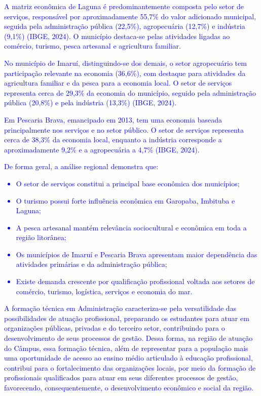 \documentclass{../../modelos/latex-shared/ifsc-ppc}
\newcommand{\revisao}[1]{\textcolor{blue}{#1}}
\newcommand{\revisao}[1]{#1}
\begin{document}
\revisao{A matriz econômica de Laguna é predominantemente composta pelo setor de serviços, responsável por aproximadamente 55,7\% do valor adicionado municipal, seguida pela administração pública (22,5\%), agropecuária (12,7\%) e indústria (9,1\%) (IBGE, 2024). O município destaca-se pelas atividades ligadas ao comércio, turismo, pesca artesanal e agricultura familiar.}

\revisao{No município de Imaruí, distinguindo-se dos demais, o setor agropecuário tem participação relevante na economia (36,6\%), com destaque para atividades da agricultura familiar e da pesca para a economia local. O setor de serviços representa cerca de 29,3\% da economia do município, seguido pela administração pública (20,8\%) e pela indústria (13,3\%) (IBGE, 2024).}

\revisao{Em Pescaria Brava, emancipado em 2013, tem uma economia baseada principalmente nos serviços e no setor público. O setor de serviços representa cerca de 38,3\% da economia local, enquanto a indústria corresponde a aproximadamente 9,2\% e a agropecuária a 4,7\% (IBGE, 2024).}

\revisao{De forma geral, a análise regional demonstra que:
\begin{itemize}
    \item O setor de serviços constitui a principal base econômica dos municípios;
    \item O turismo possui forte influência econômica em Garopaba, Imbituba e Laguna;
    \item A pesca artesanal mantém relevância sociocultural e econômica em toda a região litorânea;
    \item Os municípios de Imaruí e Pescaria Brava apresentam maior dependência das atividades primárias e da administração pública;
    \item Existe demanda crescente por qualificação profissional voltada aos setores de comércio, turismo, logística, serviços e economia do mar.
\end{itemize}}

\revisao{A formação técnica em Administração caracteriza-se pela versatilidade das possibilidades de atuação profissional, preparando os estudantes para atuar em organizações públicas, privadas e do terceiro setor, contribuindo para o desenvolvimento de seus processos de gestão. Dessa forma, na região de atuação do Câmpus, essa formação técnica, além de representar para a população mais uma oportunidade de acesso ao ensino médio articulado à educação profissional, contribui para o fortalecimento das organizações locais, por meio da formação de profissionais qualificados para atuar em seus diferentes processos de gestão, favorecendo, consequentemente, o desenvolvimento econômico e social da região.}
\end{document}
